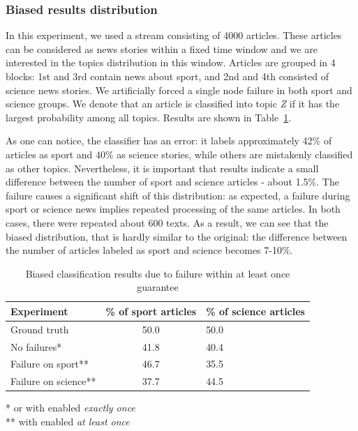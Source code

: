 \subsubsection{Biased results distribution}

In this experiment, we used a stream consisting of 4000 articles. These articles can be considered as news stories within a fixed time window and we are interested in the topics distribution in this window. Articles are grouped in 4 blocks: 1st and 3rd contain news about sport, and 2nd and 4th consisted of science news stories. We artificially forced a  single node failure in both sport and science groups. We denote that an article is classified into topic {\em Z} if it has the largest probability among all topics. Results are shown in Table~\ref{biased_results}.

 As one can notice, the classifier has an error: 
it labels approximately 42\% of articles as sport and 40\% as science stories, while others are mistakenly classified as other topics. Nevertheless, it is important that results indicate a small difference between the number of sport and science articles - about 1.5\%. The failure causes a significant shift of this distribution: as expected, a failure during sport or science news implies repeated processing of the same articles. In both cases, there were repeated about 600 texts. As a result, we can see that the biased distribution, that is hardly similar to the original: the difference between the number of articles labeled as sport and science becomes 7-10\%. 

\begin{table}[htbp]
\caption{Biased classification results due to failure within at least once guarantee}
\begin{threeparttable}
\begin{tabular}{lcl}
Experiment    & \% of sport articles & \% of science articles    \\
\hline
Ground truth   &   50.0    &   50.0    \\
No failures*   &   41.8    &   40.4    \\
Failure on sport**   &   46.7    &   35.5    \\
Failure on science**   &   37.7    &   44.5    \\
\end{tabular}
* or with enabled {\em exactly once} \\
** with enabled {\em at least once}
\end{threeparttable}
\label{biased_results}
\end{table}

